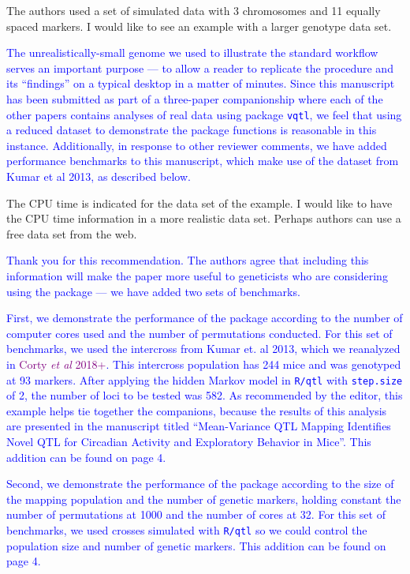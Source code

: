 \documentclass[11pt]{article}
\newcommand{\CortyReanalysisPaper}{\textcolor{purple}{Corty \emph{et al} 2018+}\xspace}
\newcommand{\ReviewerQuestion}[1]{
  \vspace{5pt}\goodbreak
  \noindent\fbox{Reviewer:} #1
  \normalfont\par
}
\newcommand{\Response}[1]{
  \goodbreak
  \textcolor{blue}{#1}
  \normalfont\par
}
\begin{document}
\ReviewerQuestion{
  The authors used a set of simulated data with 3 chromosomes and 11 equally spaced markers.
  I would like to see an example with a larger genotype data set.
}
\Response{
  The unrealistically-small genome we used to illustrate the standard workflow serves an important purpose --- to allow a reader to replicate the procedure and its ``findings'' on a typical desktop in a matter of minutes.
  Since this manuscript has been submitted as part of a three-paper companionship where each of the other papers contains analyses of real data using package \texttt{vqtl}, we feel that using a reduced dataset to demonstrate the package functions is reasonable in this instance.
  Additionally, in response to other reviewer comments, we have added performance benchmarks to this manuscript, which make use of the dataset from Kumar et al 2013, as described below.
}


\ReviewerQuestion{
  The CPU time is indicated for the data set of the example.
  I would like to have the CPU time information in a more realistic data set.
  Perhaps authors can use a free data set from the web.
}
\Response{
  Thank you for this recommendation.
  The authors agree that including this information will make the paper more useful to geneticists who are considering using the package --- we have added two sets of benchmarks.
}
\Response{
  First, we demonstrate the performance of the package according to the number of computer cores used and the number of permutations conducted.
  For this set of benchmarks, we used the intercross from Kumar et. al 2013, which we reanalyzed in \CortyReanalysisPaper.
  This intercross population has 244 mice and was genotyped at 93 markers.
  After applying the hidden Markov model in \texttt{R/qtl} with \texttt{step.size} of 2, the number of loci to be tested was 582.
  As recommended by the editor, this example helps tie together the companions, because the results of this analysis are presented in the manuscript titled ``Mean-Variance QTL Mapping Identifies Novel QTL for Circadian Activity and Exploratory Behavior in Mice''.
  This addition can be found on page 4.
}
\Response{
  Second, we demonstrate the performance of the package according to the size of the mapping population and the number of genetic markers, holding constant the number of permutations at 1000 and the number of cores at 32.
  For this set of benchmarks, we used crosses simulated with \texttt{R/qtl} so we could control the population size and number of genetic markers.
  This addition can be found on page 4.
}
\end{document}
